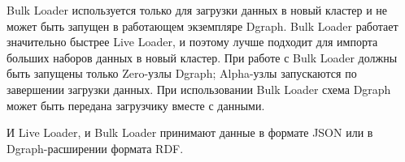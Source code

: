 Bulk Loader используется только для загрузки данных в новый кластер и не может быть запущен в
работающем экземпляре Dgraph. Bulk Loader работает значительно быстрее Live Loader, и поэтому лучше
подходит для импорта больших наборов данных в новый кластер. При работе с Bulk Loader должны быть
запущены только Zero-узлы Dgraph; Alpha-узлы запускаются по завершении загрузки данных. При
использовании Bulk Loader схема Dgraph может быть передана загрузчику вместе с данными.

И Live Loader, и Bulk Loader принимают данные в формате JSON или в Dgraph-расширении формата RDF.

